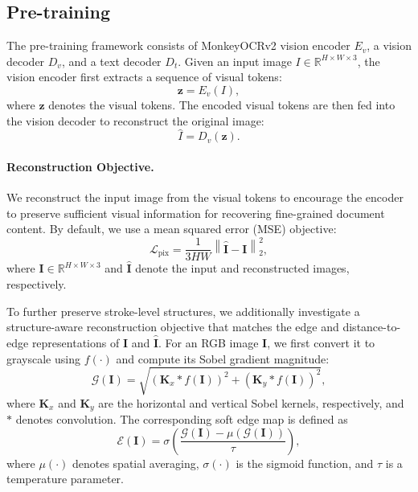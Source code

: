 \documentclass{article}
\begin{document}
\subsection{Pre-training}
The pre-training framework consists of MonkeyOCRv2 vision encoder $E_v$, a vision decoder $D_v$, and a text decoder $D_t$. Given an input image $I \in \mathbb{R}^{H \times W \times 3}$, the vision encoder first extracts a sequence of visual tokens:
\begin{equation}
\mathbf{z} = E_v(I),
\end{equation}
where $\mathbf{z}$ denotes the visual tokens. The encoded visual tokens are then fed into the vision decoder to reconstruct the original image:
\begin{equation}
\hat{I} = D_v(\mathbf{z}).
\end{equation}






\paragraph{Reconstruction Objective.}
We reconstruct the input image from the visual tokens to encourage the encoder to preserve sufficient visual information for recovering fine-grained document content.
By default, we use a mean squared error (MSE) objective:
\begin{equation}
\mathcal{L}_{\mathrm{pix}}
=
\frac{1}{3HW}
\left\|
\hat{\mathbf{I}}-\mathbf{I}
\right\|_2^2,
\label{eq:pixel_loss}
\end{equation}
where $\mathbf{I}\in\mathbb{R}^{H\times W\times 3}$ and
$\hat{\mathbf{I}}$ denote the input and reconstructed images, respectively.

To further preserve stroke-level structures, we additionally investigate a
structure-aware reconstruction objective that matches the edge and
distance-to-edge representations of $\mathbf{I}$ and $\hat{\mathbf{I}}$.
For an RGB image $\mathbf{I}$, we first convert it to grayscale using
$f(\cdot)$ and compute its Sobel gradient magnitude:
\begin{equation}
\mathcal{G}(\mathbf{I})
=
\sqrt{
\left(
\mathbf{K}_{x} * f(\mathbf{I})
\right)^2
+
\left(
\mathbf{K}_{y} * f(\mathbf{I})
\right)^2
},
\label{eq:sobel_magnitude}
\end{equation}
where $\mathbf{K}_{x}$ and $\mathbf{K}_{y}$ are the horizontal and
vertical Sobel kernels, respectively, and $*$ denotes convolution.
The corresponding soft edge map is defined as
\begin{equation}
\mathcal{E}(\mathbf{I})
=
\sigma
\left(
\frac{
\mathcal{G}(\mathbf{I})
-
\mu\!\left(\mathcal{G}(\mathbf{I})\right)
}{\tau}
\right),
\label{eq:soft_edge}
\end{equation}
where $\mu(\cdot)$ denotes spatial averaging,
$\sigma(\cdot)$ is the sigmoid function, and $\tau$ is a temperature
parameter.
\end{document}

